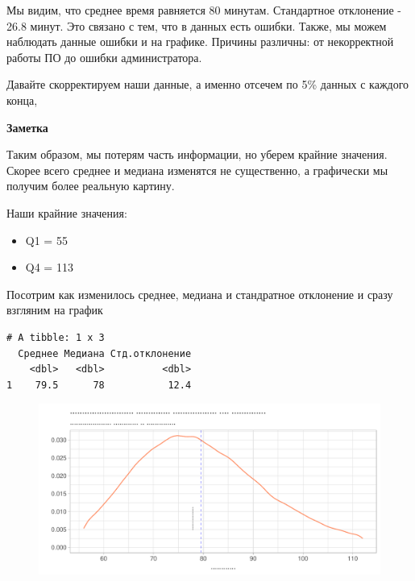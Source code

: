 \documentclass[
  letterpaper,
  DIV=11,
  numbers=noendperiod]{scrartcl}
\begin{document}
Мы видим, что среднее время равняется 80 минутам. Стандартное отклонение
- 26.8 минут. Это связано с тем, что в данных есть ошибки. Также, мы
можем наблюдать данные ошибки и на графике. Причины различны: от
некорректной работы ПО до ошибки администратора.

Давайте скорректируем наши данные, а именно отсечем по 5\% данных с
каждого конца,

\begin{tcolorbox}[enhanced jigsaw, colframe=quarto-callout-note-color-frame, leftrule=.75mm, rightrule=.15mm, toprule=.15mm, left=2mm, arc=.35mm, bottomrule=.15mm, colback=white, breakable, opacityback=0]
\begin{minipage}[t]{5.5mm}
\textcolor{quarto-callout-note-color}{\faInfo}
\end{minipage}%
\begin{minipage}[t]{\textwidth - 5.5mm}

\textbf{Заметка}\vspace{2mm}

Таким образом, мы потерям часть информации, но уберем крайние значения.
Скорее всего среднее и медиана изменятся не существенно, а графически мы
получим более реальную картину.

\end{minipage}%
\end{tcolorbox}

Наши крайние значения:

\begin{itemize}
\item
  Q1 = 55
\item
  Q4 = 113
\end{itemize}

Посотрим как изменилось среднее, медиана и стандратное отклонение и
сразу взгляним на график

\begin{verbatim}
# A tibble: 1 x 3
  Среднее Медиана Стд.отклонение
    <dbl>   <dbl>          <dbl>
1    79.5      78           12.4
\end{verbatim}

\begin{figure}

{\centering \includegraphics{./intro_files/figure-pdf/unnamed-chunk-23-1.pdf}

}

\end{figure}
\end{document}
